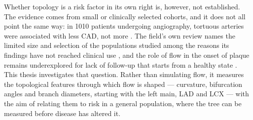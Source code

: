 Whether topology is a risk factor in its own right is, however, not established.
The evidence comes from small or clinically selected cohorts, and it does not all point the same
way: in
1010 patients undergoing angiography, tortuous arteries were associated with less CAD, not more
\cite{li2011tortuosity}.
The field's own review names the limited size and selection of the populations studied among the
reasons its findings have not reached clinical use \cite{shen2026geometry}, and the role of flow in
the onset of plaque remains underexplored for lack of follow-up that starts from a healthy state
\cite{zhang2024curvature}.
This thesis investigates that question.
Rather than simulating flow, it measures the topological features through which flow is shaped ---
curvature, bifurcation angles and branch diameters, starting with the left main, LAD and LCX ---
with the aim of relating them to risk in a general population, where the tree can be measured
before disease has altered it.
